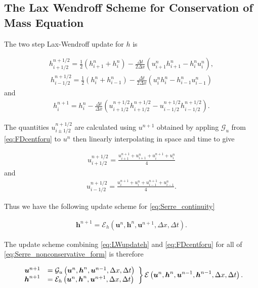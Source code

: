 \documentclass[SingleSpace,12pt,Journal]{Serre_ASCE}
\begin{document}
\subsection{The Lax Wendroff Scheme for Conservation of Mass Equation}
\label{section:}
The two step Lax-Wendroff update for $h$ is
\begin{linenomath*}
\begin{gather*}
h^{n + 1/2}_{i+ 1/2} = \frac{1}{2}\left(h^{n}_{i+1} + h^{n}_i\right) - \frac{\Delta t}{2\Delta x}\left(u^n_{i+1}h^n_{i+1} - h^n_{i}u^n_{i}\right),
\end{gather*}
\begin{gather*}
h^{n + 1/2}_{i- 1/2} = \frac{1}{2}\left(h^{n}_{i} + h^{n}_{i-1}\right) - \frac{\Delta t}{2\Delta x}\left(u^n_{i}h^n_{i} - h^n_{i-1}u^n_{i-1}\right)
\end{gather*}
and
\begin{gather*}
h^{n+1}_i = h^{n}_i - \frac{\Delta t}{\Delta x}\left(u^{n + 1/2}_{i+ 1/2}h^{n + 1/2}_{i+ 1/2} - u^{n + 1/2}_{i- 1/2}h^{n + 1/2}_{i- 1/2}\right).
\label{eq:LW4h}
\end{gather*}
\end{linenomath*}
The quantities $u^{n + 1/2}_{i \pm 1/2}$ are calculated using $u^{n+1}$ obtained by appling $\mathcal{G}_u$ from \eqref{eq:FDcentforu} to $u^n$ then linearly interpolating in space and time to give
\begin{linenomath*}
\begin{gather*}
u^{n + 1/2}_{i+ 1/2} = \frac{u^{n+1}_{i+1} + u^{n}_{i+1} + u^{n+1}_{i} + u^{n}_{i} }{4}
\end{gather*}
and
\begin{gather*}
u^{n + 1/2}_{i- 1/2} = \frac{u^{n+1}_{i} + u^{n}_{i} + u^{n+1}_{i-1}+ u^{n}_{i-1} }{4}.
\end{gather*}
\end{linenomath*}
Thus we have the following update scheme for \eqref{eq:Serre_continuity}
\begin{linenomath*}
	\begin{gather}
	\boldsymbol{h}^{n+1} = \mathcal{E}_h\left(\boldsymbol{u}^n,\boldsymbol{h}^n,\boldsymbol{u}^{n+1}, \Delta x, \Delta t \right). 
	\label{eq:LWupdateh}
	\end{gather}
\end{linenomath*}
The update scheme combining \eqref{eq:LWupdateh} and \eqref{eq:FDcentforu} for all of \eqref{eq:Serre_nonconservative_form} is therefore
\begin{linenomath*}
\begin{gather}
	\left.
	\begin{array}{l l}
	\boldsymbol{u}^{n+1}&=\mathcal{G}_u\left(\boldsymbol{u}^n,\boldsymbol{h}^n, \boldsymbol{u}^{n-1}, \Delta x, \Delta t \right) \\
	\boldsymbol{h}^{n+1}&=\mathcal{E}_h\left(\boldsymbol{u}^n,\boldsymbol{h}^n,\boldsymbol{u}^{n+1}, \Delta x, \Delta t \right)
	\end{array} \right\rbrace \mathcal{E}\left(\boldsymbol{u}^n,\boldsymbol{h}^n, \boldsymbol{u}^{n-1},\boldsymbol{h}^{n-1}, \Delta x, \Delta t \right).
	\label{eq:Enumdef}
\end{gather}
\end{linenomath*}
\end{document}
